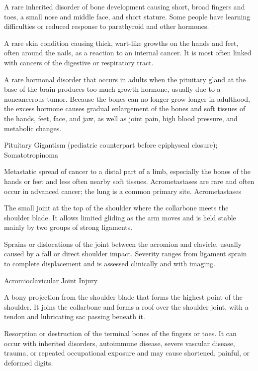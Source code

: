  A rare inherited disorder of bone development causing short, broad fingers and toes, a small nose and middle face, and short stature. Some people have learning difficulties or reduced response to parathyroid and other hormones.

 A rare skin condition causing thick, wart-like growths on the hands and feet, often around the nails, as a reaction to an internal cancer. It is most often linked with cancers of the digestive or respiratory tract.

 A rare hormonal disorder that occurs in adults when the pituitary gland at the base of the brain produces too much growth hormone, usually due to a noncancerous tumor. Because the bones can no longer grow longer in adulthood, the excess hormone causes gradual enlargement of the bones and soft tissues of the hands, feet, face, and jaw, as well as joint pain, high blood pressure, and metabolic changes.

\synonyms
Pituitary Gigantism (pediatric counterpart before epiphyseal closure); Somatotropinoma

 Metastatic spread of cancer to a distal part of a limb, especially the bones of the hands or feet and less often nearby soft tissues. Acrometastases are rare and often occur in advanced cancer; the lung is a common primary site.
\synonyms
Acrometastases

 The small joint at the top of the shoulder where the collarbone meets the shoulder blade. It allows limited gliding as the arm moves and is held stable mainly by two groups of strong ligaments.

 Sprains or dislocations of the joint between the acromion and clavicle, usually caused by a fall or direct
shoulder impact. Severity ranges from ligament sprain to complete displacement and is assessed clinically and with imaging.

\synonyms
Acromioclavicular Joint Injury

 A bony projection from the shoulder blade that forms the highest point of the shoulder. It joins the collarbone and forms a roof over the shoulder joint, with a tendon and lubricating sac passing beneath it.

 Resorption or destruction of the terminal bones of the fingers or toes. It can occur with inherited disorders, autoimmune disease, severe vascular disease, trauma, or repeated occupational exposure and may cause shortened, painful, or deformed digits.

